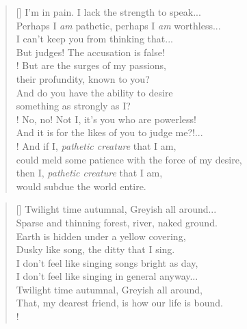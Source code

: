 \documentclass[]{article}
\begin{document}
\vspace*{0.075\textheight}
\settowidth{\versewidth}{I'm in pain. I lack the strength to speak... }
\begin{verse}[\versewidth]
I'm in pain. I lack the strength to speak... \\
Perhaps I \textit{am} pathetic, perhaps I \textit{am} worthless... \\
I can't keep you from thinking that... \\
But judges! The accusation is false!\\!
But are the surges of my passions,\\
their profundity, known to you?\\
And do you have the ability to desire\\
something as strongly as I?\\!
No, no! Not I, it's you who are powerless!\\
And it is for the likes of you to judge me?!...\\!
And if I, \textit{pathetic creature} that I am,\\
could meld some patience with the force of my desire,\\
then I, \textit{pathetic creature} that I am,\\
would subdue the world entire.\\
\end{verse}
\vspace*{0.05\textheight}

\settowidth{\versewidth}{ Twilight time autumnal, Greyish all around...}
\begin{verse}[\versewidth]
Twilight time autumnal, Greyish all around... \\
Sparse and thinning forest, river, naked ground.\\
Earth is hidden under a yellow covering,\\
Dusky like song, the ditty that I sing.\\
I don't feel like singing songs bright as day,\\
I don't feel like singing in general anyway... \\
Twilight time autumnal, Greyish all around,\\
That, my dearest friend, is how our life is bound.\\!
\end{verse}
\newpage
\end{document}
